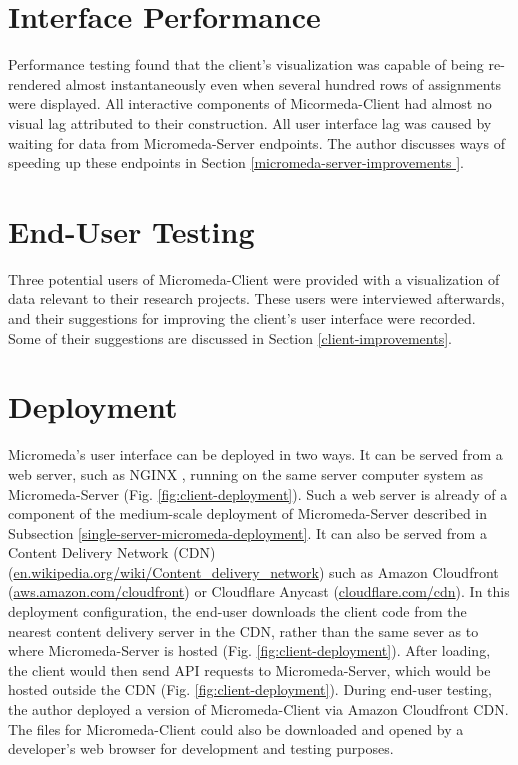 \section{Interface Performance}

Performance testing found that the client's visualization was capable of being re-rendered almost instantaneously even when several hundred rows of assignments were displayed. All interactive components of Micormeda-Client had almost no visual lag attributed to their construction. All user interface lag was caused by waiting for data from Micromeda-Server endpoints. The author discusses ways of speeding up these endpoints in Section \ref{micromeda-server-improvements
}.

\section{End-User Testing}

Three potential users of Micromeda-Client were provided with a visualization of data relevant to their research projects. These users were interviewed afterwards, and their suggestions for improving the client's user interface were recorded. Some of their suggestions are discussed in Section \ref{client-improvements}. 

\section{Deployment}

Micromeda's user interface can be deployed in two ways. It can be served from a web server, such as NGINX \cite{reese2008nginx}, running on the same server computer system as Micromeda-Server (Fig. \ref{fig:client-deployment}). Such a web server is already of a component of the medium-scale deployment of Micromeda-Server described in Subsection \ref{single-server-micromeda-deployment}. It can also be served from a Content Delivery Network (CDN) \cite{farber2003internet} (\href{en.wikipedia.org/wiki/Content\_delivery\_network}{en.wikipedia.org/wiki/Content\_delivery\_network}) such as Amazon Cloudfront \cite{varia2014overview} (\href{aws.amazon.com/cloudfront}{aws.amazon.com/cloudfront}) or Cloudflare Anycast \cite{calder2015analyzing} (\href{cloudflare.com/cdn}{cloudflare.com/cdn}). In this deployment configuration, the end-user downloads the client code from the nearest content delivery server in the CDN, rather than the same sever as to where Micromeda-Server is hosted (Fig. \ref{fig:client-deployment}). After loading, the client would then send API requests to Micromeda-Server, which would be hosted outside the CDN (Fig. \ref{fig:client-deployment}). During end-user testing, the author deployed a version of Micromeda-Client via Amazon Cloudfront CDN. The files for Micromeda-Client could also be downloaded and opened by a developer's web browser for development and testing purposes.


